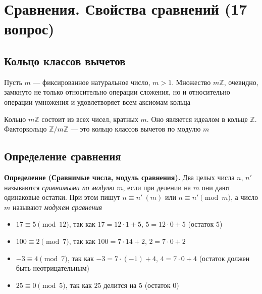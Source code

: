 \documentclass[a4paper,12pt]{article}
\theoremstyle{definition}
\theoremstyle{plain}
\theoremstyle{remark}
\begin{document}
	
	
	\newpage
	\section{Сравнения. Свойства сравнений (17 вопрос)}
	
	\subsection{Кольцо классов вычетов}
	
	\noindent Пусть $m$ — фиксированное натуральное число, $m > 1$. Множество $m\mathbb{Z}$, очевидно, замкнуто не только относительно операции сложения, но и относительно операции умножения и удовлетворяет всем аксиомам кольца
	
	\begin{tcolorbox}[colback=blue!5, colframe=blue!40!black, title=Замечание]
	Кольцо $m\mathbb{Z}$ состоит из всех чисел, кратных $m$. Оно является идеалом в кольце $\mathbb{Z}$. Факторкольцо $\mathbb{Z}/m\mathbb{Z}$ — это кольцо классов вычетов по модулю $m$
	\end{tcolorbox}
	
	\subsection{Определение сравнения}
	
	\noindent \textbf{Определение (Сравнимые числа, модуль сравнения).}
	Два целых числа $n$, $n'$ называются \textit{сравнимыми по модулю $m$}, если при делении на $m$ они дают одинаковые остатки. При этом пишут $n \equiv n' \ (m)$ или $n \equiv n' \pmod{m}$, а число $m$ называют \textit{модулем сравнения}
	
	\begin{tcolorbox}[colback=gray!5, colframe=gray!50, title=Примеры]
	\begin{itemize}
	\item $17 \equiv 5 \pmod{12}$, так как $17 = 12 \cdot 1 + 5$, $5 = 12 \cdot 0 + 5$ (остаток $5$)
	\item $100 \equiv 2 \pmod{7}$, так как $100 = 7 \cdot 14 + 2$, $2 = 7 \cdot 0 + 2$
	\item $-3 \equiv 4 \pmod{7}$, так как $-3 = 7 \cdot (-1) + 4$, $4 = 7 \cdot 0 + 4$ (остаток должен быть неотрицательным)
	\item $25 \equiv 0 \pmod{5}$, так как $25$ делится на $5$ (остаток $0$)
	\end{itemize}
	\end{tcolorbox}
	
\end{document}

